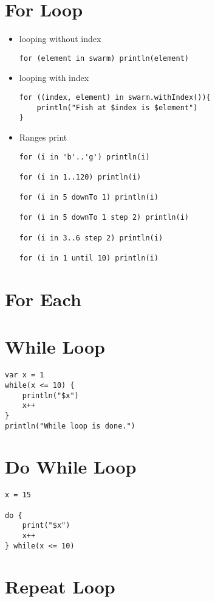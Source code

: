 \documentclass[11pt]{article}
\begin{document}
\section*{For Loop}
\label{sec:org7de060d}
\begin{itemize}
\item looping without index
\begin{verbatim}
for (element in swarm) println(element)
\end{verbatim}
\item looping with index
\begin{verbatim}
for ((index, element) in swarm.withIndex()){
    println("Fish at $index is $element")
}
\end{verbatim}
\item Ranges print
\begin{verbatim}
for (i in 'b'..'g') println(i)

for (i in 1..120) println(i)

for (i in 5 downTo 1) println(i)

for (i in 5 downTo 1 step 2) println(i)

for (i in 3..6 step 2) println(i)

for (i in 1 until 10) println(i)
\end{verbatim}
\end{itemize}
\section*{For Each}
\label{sec:orgd9f1eba}
\section*{While Loop}
\label{sec:org6d1aecb}
\begin{verbatim}
var x = 1
while(x <= 10) {
    println("$x")
    x++
}
println("While loop is done.")
\end{verbatim}
\section*{Do While Loop}
\label{sec:orgb233dc4}
\begin{verbatim}
x = 15

do {
    print("$x")
    x++
} while(x <= 10)
\end{verbatim}
\section*{Repeat Loop}
\label{sec:org7ba46bb}
\end{document}
